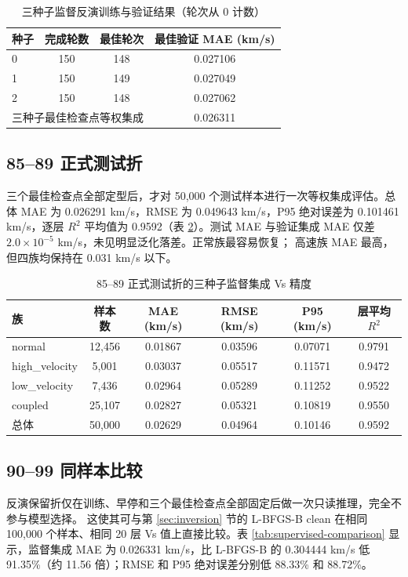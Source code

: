 \documentclass[UTF8,a4paper,11pt]{ctexart}
\begin{document}
\begin{table}[H]
\centering
\caption{三种子监督反演训练与验证结果（轮次从 0 计数）}
\label{tab:supervised-training}
\begin{tabular}{lccc}
\toprule
种子 & 完成轮数 & 最佳轮次 & 最佳验证 MAE (km/s) \\
\midrule
0 & 150 & 148 & 0.027106 \\
1 & 150 & 149 & 0.027049 \\
2 & 150 & 148 & 0.027062 \\
\midrule
\multicolumn{3}{l}{三种子最佳检查点等权集成} & 0.026311 \\
\bottomrule
\end{tabular}
\end{table}

\subsection{85--89 正式测试折}
三个最佳检查点全部定型后，才对 50{,}000 个测试样本进行一次等权集成评估。总体
MAE 为 0.026291 km/s，RMSE 为 0.049643 km/s，P95 绝对误差为
0.101461 km/s，逐层 \(R^2\) 平均值为 0.9592（表 \ref{tab:supervised-test}）。测试 MAE
与验证集成 MAE 仅差 \(2.0\times10^{-5}\) km/s，未见明显泛化落差。正常族最容易恢复；
高速族 MAE 最高，但四族均保持在 0.031 km/s 以下。

\begin{table}[H]
\centering
\caption{85--89 正式测试折的三种子监督集成 Vs 精度}
\label{tab:supervised-test}
\small
\begin{tabular}{lccccc}
\toprule
族 & 样本数 & MAE (km/s) & RMSE (km/s) & P95 (km/s) & 层平均 \(R^2\) \\
\midrule
normal & 12{,}456 & 0.01867 & 0.03596 & 0.07071 & 0.9791 \\
high\_velocity & 5{,}001 & 0.03037 & 0.05517 & 0.11571 & 0.9472 \\
low\_velocity & 7{,}436 & 0.02964 & 0.05289 & 0.11252 & 0.9522 \\
coupled & 25{,}107 & 0.02827 & 0.05321 & 0.10819 & 0.9550 \\
\midrule
总体 & 50{,}000 & 0.02629 & 0.04964 & 0.10146 & 0.9592 \\
\bottomrule
\end{tabular}
\end{table}

\subsection{90--99 同样本比较}
反演保留折仅在训练、早停和三个最佳检查点全部固定后做一次只读推理，完全不参与模型选择。
这使其可与第 \ref{sec:inversion} 节的 L-BFGS-B clean 在相同 100{,}000 个样本、相同
20 层 Vs 值上直接比较。表 \ref{tab:supervised-comparison} 显示，监督集成 MAE 为
0.026331 km/s，比 L-BFGS-B 的 0.304444 km/s 低 91.35\%（约 11.56 倍）；RMSE
和 P95 绝对误差分别低 88.33\% 和 88.72\%。
\end{document}
